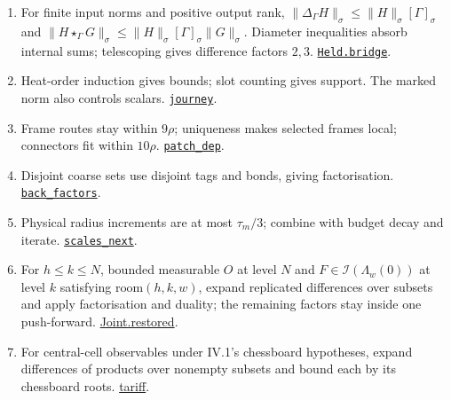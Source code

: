 \documentclass[
  letterpaper,
  11pt]{article}
\newcounter{none} %
\begin{document}
\begin{enumerate}
\def\labelenumi{\arabic{enumi}.}
\item
  For finite input norms and positive output rank,
  \(\|\Delta_\Gamma H\|_\sigma\le\|H\|_\sigma[\Gamma]_\sigma\) and
  \(\|H\star_\Gamma G\|_\sigma\le\|H\|_\sigma[\Gamma]_\sigma\|G\|_\sigma\).
  Diameter inequalities absorb internal sums; telescoping gives
  difference factors \(2,3\).
  \href{https://github.com/yang-mills-group/OpenAI-YM-20261028/blob/3456e5e75cf8d4cd558955a5c7638fba2d68f464/YM/RG08/Forms/Weld.lean\#L102}{\texttt{Held.bridge}}.
\item
  Heat-order induction gives bounds; slot counting gives support. The
  marked norm also controls scalars.
  \href{https://github.com/yang-mills-group/OpenAI-YM-20261028/blob/3456e5e75cf8d4cd558955a5c7638fba2d68f464/YM/RG08/Skiff/Spoke.lean\#L92-L127}{\texttt{journey}}.
\item
  Frame routes stay within \(9\rho\); uniqueness makes selected frames
  local; connectors fit within \(10\rho\).
  \href{https://github.com/yang-mills-group/OpenAI-YM-20261028/blob/3456e5e75cf8d4cd558955a5c7638fba2d68f464/YM/Push/GRID_APPROXIMATION/Cone.lean\#L115-L155}{\texttt{patch\_dep}}.
\item
  Disjoint coarse sets use disjoint tags and bonds, giving
  factorisation.
  \href{https://github.com/yang-mills-group/OpenAI-YM-20261028/blob/3456e5e75cf8d4cd558955a5c7638fba2d68f464/YM/Push/GRID_APPROXIMATION/KernelLocal.lean\#L141-L150}{\texttt{back\_factors}}.
\item
  Physical radius increments are at most \(\tau_m/3\); combine with
  budget decay and iterate.
  \href{https://github.com/yang-mills-group/OpenAI-YM-20261028/blob/3456e5e75cf8d4cd558955a5c7638fba2d68f464/YM/Push/GRID_APPROXIMATION/Geometry.lean\#L135-L145}{\texttt{scales\_next}}.
\item
  For \(h\le k\le N\), bounded measurable \(O\) at level \(N\) and
  \(F\in\mathcal I(\Lambda_w(0))\) at level \(k\) satisfying
  \(\mathrm{room}(h,k,w)\), expand replicated differences over subsets
  and apply factorisation and duality; the remaining factors stay inside
  one push-forward.
  \href{https://github.com/yang-mills-group/OpenAI-YM-20261028/blob/3456e5e75cf8d4cd558955a5c7638fba2d68f464/YM/Push/GRID_APPROXIMATION/Joint.lean\#L102-L128}{Joint.restored}.
\item
  For central-cell observables under IV.1's chessboard hypotheses,
  expand differences of products over nonempty subsets and bound each by
  its chessboard roots.
  \href{https://github.com/yang-mills-group/OpenAI-YM-20261028/blob/3456e5e75cf8d4cd558955a5c7638fba2d68f464/YM/Push/GRID_APPROXIMATION/Telescope.lean\#L34-L78}{tariff}.
\end{enumerate}
\end{document}

